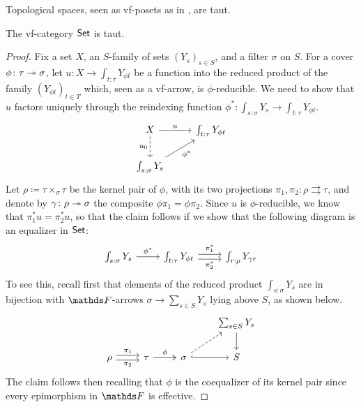 \begin{ex}\label{ex:top-sp-are-taut-vf-posets}
    Topological spaces, seen as vf-posets as in , are taut. 
\end{ex}

\begin{lem}\label{lem:set-is-taut}
The vf-category $\mathsf{Set}$ is taut.
\begin{proof}
    Fix a set $X$, an $S$-family of sets $(Y_s)_{s\in S}$, and a filter $\sigma$ on $S$. For a cover $\phi \colon \tau \twoheadrightarrow \sigma$, let $u \colon X \to \int_{t:\tau} Y_{\phi t}$ be a function into the reduced product of the family $(Y_{\phi t})_{t\in T}$ which, seen as a vf-arrow, is $\phi$-reducible. We need to show that $u$ factors uniquely through the reindexing function $\phi^* \colon \int_{s:\sigma} Y_s \to \int_{t:\tau} Y_{\phi t}$.
    \[\begin{tikzcd}
        X & {\int_{t:\tau}Y_{\phi t}} \\
        {\int_{s:\sigma}Y_{s}}
        \arrow["u", from=1-1, to=1-2]
        \arrow["{u_0}"', dashed, from=1-1, to=2-1]
        \arrow["{\phi^*}"', from=2-1, to=1-2]
    \end{tikzcd}\]
    Let $\rho \coloneqq \tau\times_\sigma\tau$ be the kernel pair of $\phi$, with its two projections $\pi_1,\pi_2 \colon \rho \rightrightarrows \tau$, and denote by $\gamma \colon \rho \twoheadrightarrow \sigma$ the composite $\phi\pi_1=\phi\pi_2$. Since $u$ is $\phi$-reducible, we know that $\pi_1^* u = \pi_2^*u$, so that the claim follows if we show that the following diagram is an equalizer in $\mathsf{Set}$:
\[\begin{tikzcd}
	{\int_{s:\sigma} Y_s} & {\int_{t:\tau}Y_{\phi t}} & {\int_{r:\rho}Y_{\gamma r}}
	\arrow["{\phi^*}", from=1-1, to=1-2]
	\arrow["{\pi_2^*}"', shift right, from=1-2, to=1-3]
	\arrow["{\pi_1^*}", shift left, from=1-2, to=1-3]
\end{tikzcd}\]
To see this, recall first that elements of the reduced product $\int_{s:\sigma}Y_{s}$ are in bijection with $\FF$-arrows $\sigma \to \sum_{s\in S} Y_s$ lying above $S$, as shown below. 
\[\begin{tikzcd}
	&&& {\sum_{s\in S}Y_s} \\
	\rho & \tau & \sigma & S
	\arrow[from=1-4, to=2-4]
	\arrow["{\pi_2}"', shift right, from=2-1, to=2-2]
	\arrow["{\pi_1}", shift left, from=2-1, to=2-2]
	\arrow["\phi", two heads, from=2-2, to=2-3]
	\arrow[dashed, from=2-3, to=1-4]
	\arrow[hook, from=2-3, to=2-4]
\end{tikzcd}\]
The claim follows then recalling that $\phi$ is the coequalizer of its kernel pair since every epimorphism in $\FF$ is effective.
\end{proof}
\end{lem}

